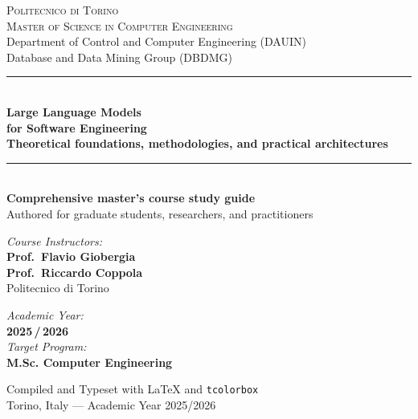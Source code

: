 \documentclass[../main.tex]{subfiles}
\begin{document}
\begin{titlepage}
\begin{center}

\vspace*{1.5cm}

{\Large\scshape Politecnico di Torino}\\[0.3cm]
{\large\scshape Master of Science in Computer Engineering}\\[0.2cm]
{\small Department of Control and Computer Engineering (DAUIN)}\\[0.1cm]
{\small Database and Data Mining Group (DBDMG)}\\[1.5cm]

\rule{\linewidth}{1.5pt}\\[0.5cm]
{\Huge\bfseries\color{politoNavy} Large Language Models\\[0.3cm] for Software Engineering}\\[0.4cm]
{\Large\bfseries\color{steelBlue} Theoretical foundations, methodologies, and practical architectures}\\[0.3cm]
\rule{\linewidth}{1.5pt}\\[1.5cm]

{\large\bfseries Comprehensive master's course study guide}\\[0.5cm]
{\normalsize Authored for graduate students, researchers, and practitioners}\\[2.5cm]

\begin{minipage}[t]{0.45\textwidth}
\begin{flushleft} \large
\emph{Course Instructors:}\\
\textbf{Prof.~Flavio Giobergia}\\
\textbf{Prof.~Riccardo Coppola}\\
\vspace{0.2cm}
{\small Politecnico di Torino}
\end{flushleft}
\end{minipage}
\hfill
\begin{minipage}[t]{0.45\textwidth}
\begin{flushright} \large
\emph{Academic Year:}\\
\textbf{2025\,/\,2026}\\[0.5cm]
\emph{Target Program:}\\
\textbf{M.Sc. Computer Engineering}
\end{flushright}
\end{minipage}

\vfill

{\small\sffamily\color{bodyGray} Compiled and Typeset with \LaTeX{} and \texttt{tcolorbox}\\
Torino, Italy --- Academic Year 2025/2026}

\end{center}
\end{titlepage}
\end{document}
